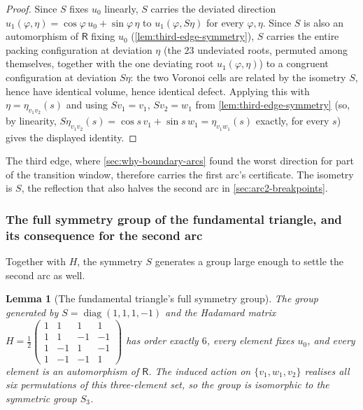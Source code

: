 \documentclass[11pt,reqno]{amsart}
\renewcommand{\_}{\origunderscore\allowbreak}
\numberwithin{equation}{section}
\theoremstyle{plain}
\newtheorem{lem}[thm]{Lemma}
\theoremstyle{definition}
\theoremstyle{remark}
\newcommand{\Rt}{\mathsf{R}}                 %
\newcommand{\tilt}{\varphi}                  %
\newcommand{\arcp}{s}                        %
\newcommand{\dev}{\eta}                      %
\DeclareMathOperator{\diag}{diag}
\begin{document}
\begin{proof}
Since $S$ fixes $u_0$ linearly, $S$ carries the deviated direction
$u_1(\tilt,\dev)=\cos\tilt\,u_0+\sin\tilt\,\dev$ to
$u_1(\tilt,S\dev)$ for every $\tilt,\dev$. Since $S$ is also an
automorphism of $\Rt$ fixing $u_0$ (\cref{lem:third-edge-symmetry}),
$S$ carries the entire packing configuration at deviation $\dev$ (the
$23$ undeviated roots, permuted among themselves, together with the
one deviating root $u_1(\tilt,\dev)$) to a congruent configuration at
deviation $S\dev$: the two Voronoi cells are related by the isometry
$S$, hence have identical volume, hence identical defect. Applying
this with $\dev=\dev_{v_1v_2}(\arcp)$ and using $Sv_1=v_1$, $Sv_2=w_1$
from \cref{lem:third-edge-symmetry} (so, by linearity,
$S\dev_{v_1v_2}(\arcp)=\cos\arcp\,v_1+\sin\arcp\,w_1=\dev_{v_1w_1}(\arcp)$
exactly, for every $\arcp$) gives the
displayed identity.
\end{proof}

The third edge, where \cref{sec:why-boundary-arcs} found the worst
direction for part of the transition window, therefore carries the
first arc's certificate. The isometry is $S$, the reflection that also
halves the second arc in \cref{sec:arc2-breakpoints}.

\subsubsection{The full symmetry group of the fundamental triangle, and its consequence for the second arc}\label{sec:full-triangle-symmetry}

Together with $H$, the symmetry $S$ generates a group large enough to
settle the second arc as well.

\begin{lem}[The fundamental triangle's full symmetry group]\label{lem:s3-symmetry}
The group generated by $S=\diag(1,1,1,-1)$ and the Hadamard matrix
$H=\tfrac12\left(\begin{smallmatrix}1&1&1&1\\1&1&-1&-1\\1&-1&1&-1\\1&-1&-1&1\end{smallmatrix}\right)$
has order exactly $6$, every element fixes $u_0$, and every element is
an automorphism of $\Rt$. The induced action on $\{v_1,w_1,v_2\}$
realises all six permutations of this three-element set, so the group
is isomorphic to the symmetric group $S_3$.
\end{lem}
\end{document}
